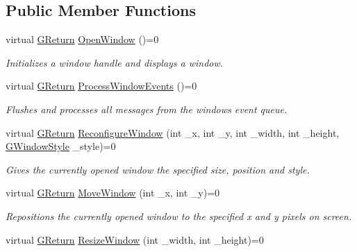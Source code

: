 \subsection*{Public Member Functions}
\begin{DoxyCompactItemize}
\item 
virtual \mbox{\hyperlink{namespace_g_w_a67a839e3df7ea8a5c5686613a7a3de21}{G\+Return}} \mbox{\hyperlink{class_g_w_1_1_s_y_s_t_e_m_1_1_g_window_a402b550212d77f19638ef1a1db9ad397}{Open\+Window}} ()=0
\begin{DoxyCompactList}\small\item\em Initializes a window handle and displays a window. \end{DoxyCompactList}\item 
virtual \mbox{\hyperlink{namespace_g_w_a67a839e3df7ea8a5c5686613a7a3de21}{G\+Return}} \mbox{\hyperlink{class_g_w_1_1_s_y_s_t_e_m_1_1_g_window_a6c7db60db04436ac21cba3147f287e84}{Process\+Window\+Events}} ()=0
\begin{DoxyCompactList}\small\item\em Flushes and processes all messages from the window\textquotesingle{}s event queue. \end{DoxyCompactList}\item 
virtual \mbox{\hyperlink{namespace_g_w_a67a839e3df7ea8a5c5686613a7a3de21}{G\+Return}} \mbox{\hyperlink{class_g_w_1_1_s_y_s_t_e_m_1_1_g_window_a113350a164370d30932a0476f00e4ea9}{Reconfigure\+Window}} (int \+\_\+x, int \+\_\+y, int \+\_\+width, int \+\_\+height, \mbox{\hyperlink{namespace_g_w_1_1_s_y_s_t_e_m_ad117891e556631f842625c348d36a071}{G\+Window\+Style}} \+\_\+style)=0
\begin{DoxyCompactList}\small\item\em Gives the currently opened window the specified size, position and style. \end{DoxyCompactList}\item 
virtual \mbox{\hyperlink{namespace_g_w_a67a839e3df7ea8a5c5686613a7a3de21}{G\+Return}} \mbox{\hyperlink{class_g_w_1_1_s_y_s_t_e_m_1_1_g_window_a9fc043b893f26c35e6ba965adcc17edb}{Move\+Window}} (int \+\_\+x, int \+\_\+y)=0
\begin{DoxyCompactList}\small\item\em Repositions the currently opened window to the specified x and y pixels on screen. \end{DoxyCompactList}\item 
virtual \mbox{\hyperlink{namespace_g_w_a67a839e3df7ea8a5c5686613a7a3de21}{G\+Return}} \mbox{\hyperlink{class_g_w_1_1_s_y_s_t_e_m_1_1_g_window_a92633707248f32e4c166f27f03690d6d}{Resize\+Window}} (int \+\_\+width, int \+\_\+height)=0

\end{DoxyCompactItemize}
